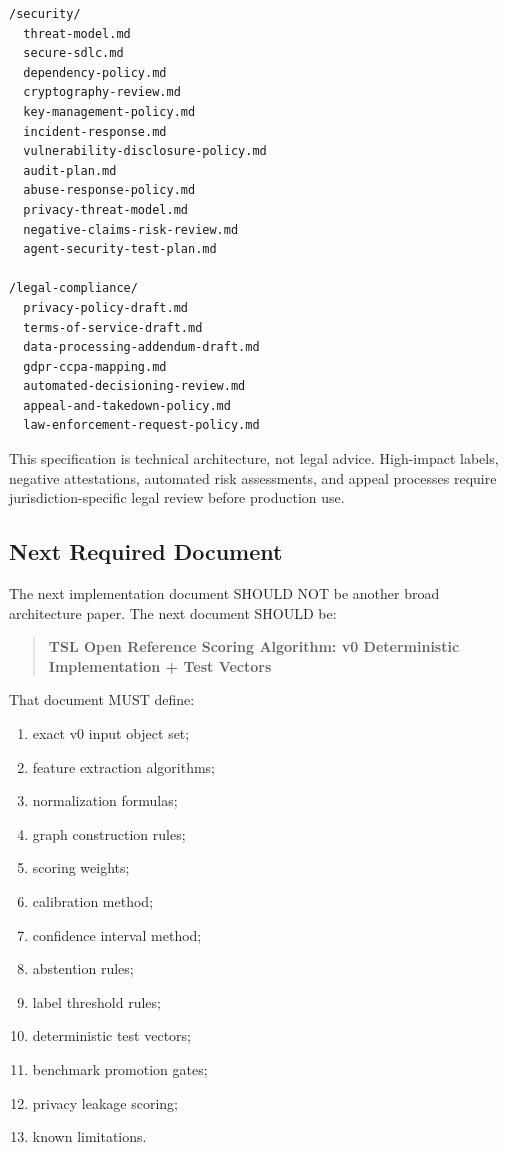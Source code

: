 \documentclass[11pt]{article}
\begin{document}
\begin{lstlisting}[style=tslcode]
/security/
  threat-model.md
  secure-sdlc.md
  dependency-policy.md
  cryptography-review.md
  key-management-policy.md
  incident-response.md
  vulnerability-disclosure-policy.md
  audit-plan.md
  abuse-response-policy.md
  privacy-threat-model.md
  negative-claims-risk-review.md
  agent-security-test-plan.md

/legal-compliance/
  privacy-policy-draft.md
  terms-of-service-draft.md
  data-processing-addendum-draft.md
  gdpr-ccpa-mapping.md
  automated-decisioning-review.md
  appeal-and-takedown-policy.md
  law-enforcement-request-policy.md
\end{lstlisting}

This specification is technical architecture, not legal advice. High-impact labels, negative attestations, automated risk assessments, and appeal processes require jurisdiction-specific legal review before production use.

\subsection{Next Required Document}

The next implementation document SHOULD NOT be another broad architecture paper. The next document SHOULD be:

\begin{quote}
\textbf{TSL Open Reference Scoring Algorithm: v0 Deterministic Implementation + Test Vectors}
\end{quote}

That document MUST define:

\begin{enumerate}
    \item exact v0 input object set;
    \item feature extraction algorithms;
    \item normalization formulas;
    \item graph construction rules;
    \item scoring weights;
    \item calibration method;
    \item confidence interval method;
    \item abstention rules;
    \item label threshold rules;
    \item deterministic test vectors;
    \item benchmark promotion gates;
    \item privacy leakage scoring;
    \item known limitations.
\end{enumerate}
\end{document}
